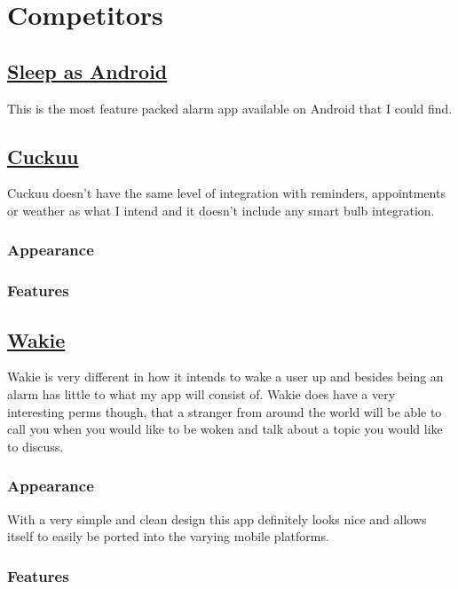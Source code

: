 \section{Competitors}\label{competitors}

\subsection{\texorpdfstring{\href{http://sleep.urbandroid.org/}{Sleep as
Android}}{Sleep as Android}}\label{sleep-as-android}

This is the most feature packed alarm app available on Android that I
could find.

\subsection{\texorpdfstring{\href{https://cuckuu.com/}{Cuckuu}}{Cuckuu}}\label{cuckuu}

Cuckuu doesn't have the same level of integration with reminders,
appointments or weather as what I intend and it doesn't include any
smart bulb integration.

\subsubsection{Appearance}\label{appearance}

\subsubsection{Features}\label{features}

\subsection{\texorpdfstring{\href{https://wakie.com/}{Wakie}}{Wakie}}\label{wakie}

Wakie is very different in how it intends to wake a user up and besides
being an alarm has little to what my app will consist of. Wakie does
have a very interesting perms though, that a stranger from around the
world will be able to call you when you would like to be woken and talk
about a topic you would like to discuss.

\subsubsection{Appearance}\label{appearance-1}

With a very simple and clean design this app definitely looks nice and
allows itself to easily be ported into the varying mobile platforms.

\subsubsection{Features}\label{features-1}
